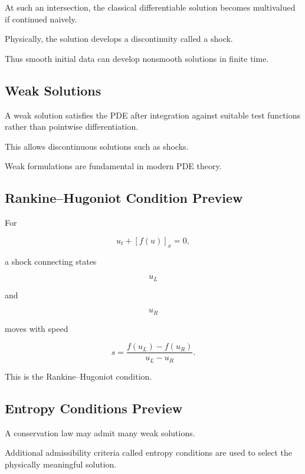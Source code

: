 At such an intersection, the classical differentiable solution becomes
multivalued if continued naively.

Physically, the solution develops a discontinuity called a shock.

Thus smooth initial data can develop nonsmooth solutions in finite time.

\subsection{Weak Solutions}
\label{subsec:weak-solutions-preview}

A weak solution satisfies the PDE after integration against suitable test
functions rather than pointwise differentiation.

This allows discontinuous solutions such as shocks.

Weak formulations are fundamental in modern PDE theory.

\subsection{Rankine--Hugoniot Condition Preview}
\label{subsec:rankine-hugoniot-preview}

For

\[
u_t+[f(u)]_x=0,
\]

a shock connecting states

\[
u_L
\]

and

\[
u_R
\]

moves with speed

\[
\boxed{
s
=
\frac{
f(u_L)-f(u_R)
}{
u_L-u_R
}.
}
\]

This is the Rankine--Hugoniot condition.

\subsection{Entropy Conditions Preview}
\label{subsec:entropy-conditions-preview}

A conservation law may admit many weak solutions.

Additional admissibility criteria called entropy conditions are used to
select the physically meaningful solution.

